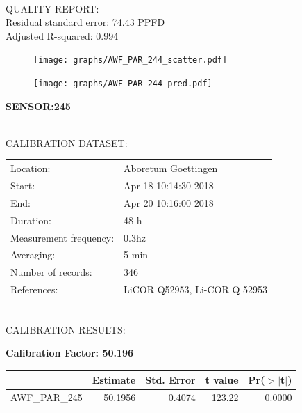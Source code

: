 \documentclass[oneside]{report}
\begin{document}
\hrulefill\\
QUALITY REPORT:\\
Residual standard error: 74.43 PPFD\\
Adjusted R-squared: 0.994



\begin{figure}[H]
  \centering
  \texttt{[image: graphs/AWF\_PAR\_244\_scatter.pdf]}
\end{figure}




\begin{figure}[H]
  \centering
  \texttt{[image: graphs/AWF\_PAR\_244\_pred.pdf]}
\end{figure}

\pagebreak


\begin{center}
\large{\textbf{SENSOR:245}}\\
\end{center}

\hrulefill\\
CALIBRATION DATASET:\\
\begin{table}[h!]
  \centering
  \label{tab:table1}
  \begin{tabular}{ll}
    Location: & Aboretum Goettingen\\ 
    
    
    Start:  & Apr 18 10:14:30 2018 \\
    End:   & Apr 20 10:16:00 2018\\ 
    Duration: & 48 h\\
    Measurement frequency: & 0.3hz\\
    Averaging:  &5 min\\
    Number of records: & 346 \\
    References: & LiCOR Q52953, Li-COR Q 52953 \\
  \end{tabular}
\end{table}

\hrulefill\\
CALIBRATION RESULTS:\\


\begin{center}
\textbf{\large{Calibration Factor: 50.196}}\\
\end{center}
\begin{table}[ht]
\centering
\begin{tabular}{rrrrr}
  \hline
 & Estimate & Std. Error & t value & Pr($>$$|$t$|$) \\ 
  \hline
AWF\_PAR\_245 & 50.1956 & 0.4074 & 123.22 & 0.0000 \\ 
   \hline
\end{tabular}
\end{table}
\end{document}
